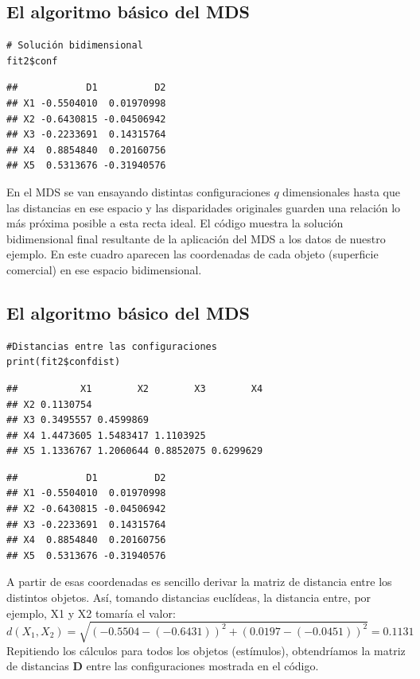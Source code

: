 \documentclass[]{article}
\begin{document}
\subsection{El algoritmo básico del
MDS}\label{el-algoritmo-buxe1sico-del-mds-1}

\hypertarget{left}{}
\begin{verbatim}
# Solución bidimensional
fit2$conf
\end{verbatim}

\begin{verbatim}
##            D1          D2
## X1 -0.5504010  0.01970998
## X2 -0.6430815 -0.04506942
## X3 -0.2233691  0.14315764
## X4  0.8854840  0.20160756
## X5  0.5313676 -0.31940576
\end{verbatim}

\hypertarget{right}{}
En el MDS se van {ensayando distintas configuraciones \(q\)
dimensionales} hasta que las {distancias en ese espacio y las
disparidades originales guarden una relación lo más próxima posible a
esta recta ideal}. El código muestra la {solución bidimensional final}
resultante de la aplicación del MDS a los datos de nuestro ejemplo. En
este cuadro aparecen las {coordenadas de cada objeto (superficie
comercial) en ese espacio bidimensional}.

\subsection{El algoritmo básico del
MDS}\label{el-algoritmo-buxe1sico-del-mds-2}

\hypertarget{left}{}
\begin{verbatim}
#Distancias entre las configuraciones
print(fit2$confdist)
\end{verbatim}

\begin{verbatim}
##           X1        X2        X3        X4
## X2 0.1130754                              
## X3 0.3495557 0.4599869                    
## X4 1.4473605 1.5483417 1.1103925          
## X5 1.1336767 1.2060644 0.8852075 0.6299629
\end{verbatim}

\begin{verbatim}
##            D1          D2
## X1 -0.5504010  0.01970998
## X2 -0.6430815 -0.04506942
## X3 -0.2233691  0.14315764
## X4  0.8854840  0.20160756
## X5  0.5313676 -0.31940576
\end{verbatim}

\hypertarget{right}{}
A partir de esas {coordenadas} es sencillo derivar la {matriz de
distancia entre los distintos objetos}. Así, tomando {distancias
euclídeas}, la distancia entre, por ejemplo, X1 y X2 tomaría el valor:
\[d(X_1,X_2)=\sqrt{(-0.5504-(-0.6431))^2+(0.0197-(-0.0451))^2}=0.1131\]
Repitiendo los cálculos para todos los objetos (estímulos), obtendríamos
la {matriz de distancias \(\textbf{D}\) entre las configuraciones}
mostrada en el código.
\end{document}
